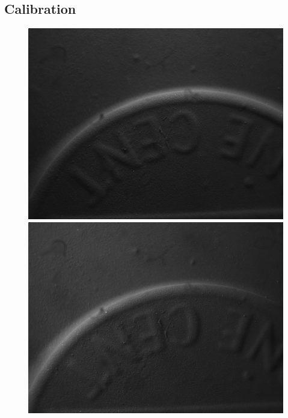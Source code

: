 \documentclass[10pt,twocolumn,letterpaper]{article}
\begin{document}
\subsection {Calibration} 



\begin{figure}[ht]
\includegraphics[width=\textwidth]{images/coin1.png}
\endminipage\hfill
{}
\includegraphics[width=\textwidth]{images/coin2.png}
\endminipage\hfill
{}

\end{figure}
\end{document}
